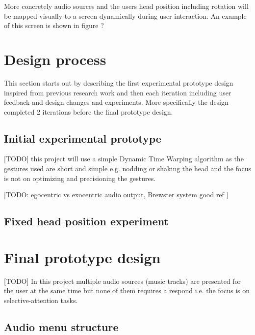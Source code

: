 More concretely audio sources and the users head position including rotation will be mapped visually to a screen dynamically during user interaction. An example of this screen is shown in figure ?

\section{Design process}
This section starts out by describing the first experimental prototype design inspired from previous research work and then each iteration including user feedback and design changes and experiments. More specifically the design completed 2 iterations before the final prototype design.

\subsection{Initial experimental prototype}

[TODO]
this project will use a simple Dynamic Time Warping algorithm \cite{meinard_muller_information_2007} as the gestures used are short and simple e.g. nodding or shaking the head and the focus is not on optimizing and precisioning the gestures.

[TODO: egocentric vs exocentric audio output, Brewster system good ref \cite{vazquez-alvarez_eyes-free_2011}]

\subsection{Fixed head position experiment}


\section{Final prototype design}

[TODO]
In this project multiple audio sources (music tracks) are presented for the user at the same time but none of them requires a respond i.e. the focus is on selective-attention tasks.

\subsection{Audio menu structure}



